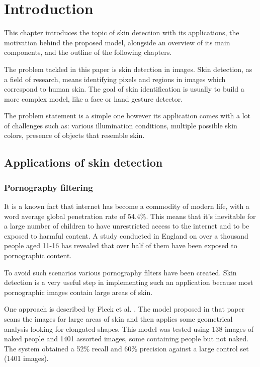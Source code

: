 \documentclass[12pt]{report}
\begin{document}
	
	\tableofcontents
	\listoffigures
	\listoftables
	\newpage
	
	
	\chapter{Introduction}
	
	This chapter introduces the topic of skin detection with its applications, the motivation behind the proposed model, alongside an overview of its main components, and the outline of the following chapters.
	
	The problem tackled in this paper is skin detection in images. Skin detection, as a field of research,  means identifying pixels and regions in images which correspond to human skin. The goal of skin identification is usually to build a more complex model, like a face or hand gesture detector.
	
	The problem statement is a simple one however its application comes with a lot of challenges such as: various illumination conditions, multiple possible skin colors, presence of objects that resemble skin.
	
	\section{Applications of skin detection}
	
	\subsection{Pornography filtering}
	It is a known fact that internet has become a commodity of modern life, with a word average global penetration rate of 54.4\%\cite{internet_stats}. This means that it's inevitable for a large number of children to have unrestricted access to the internet and to be exposed to harmful content. A study conducted in England\cite{children_exposure} on over a thousand people aged 11-16 has revealed that over half of them have been exposed to pornographic content. 
	
	To avoid such scenarios various pornography filters have been created. Skin detection is a very useful step in implementing such an application because most pornographic images contain large areas of skin.
	
	One approach is described by Fleck et al. \cite{finding_naked_people}. The model proposed in that paper scans the images for large areas of skin and then applies some geometrical analysis looking for elongated shapes. This model was tested using 138 images of naked people and 1401 assorted images, some containing people but not naked. The system obtained a 52\% recall and 60\% precision against a large control set (1401 images).
	
\end{document}
